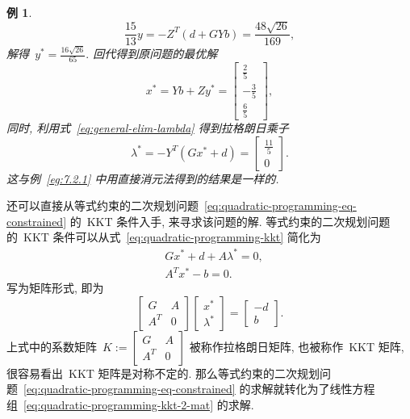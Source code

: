 \documentclass{SBCbookchapter}
\newtheorem{exam}[thm]{例}
\numberwithin{equation}{section}
\begin{document}
\begin{exam}
\begin{equation*}
\frac{15}{13} y = - Z^T \left( d + G Y b \right) = \frac{48 \sqrt{26}}{169},
\end{equation*}
解得~$y^* = \frac{16 \sqrt{26}}{65}.$ 回代得到原问题的最优解
\begin{equation*}
{x}^* = Y {b} + Z y^* = \left[\begin{matrix} \frac{2}{5} \\ - \frac{3}{5} \\ \frac{6}{5} \end{matrix}\right],
\end{equation*}
同时, 利用式~\eqref{eq:general-elim-lambda} 得到拉格朗日乘子
\begin{equation*}
{\lambda}^* = - Y^T \left( G {x}^* + {d} \right) = \left[\begin{matrix} \frac{11}{5} \\ 0 \end{matrix}\right].
\end{equation*}
这与例~\eqref{eg:7.2.1} 中用直接消元法得到的结果是一样的.
\end{exam}

还可以直接从等式约束的二次规划问题~\eqref{eq:quadratic-programming-eq-constrained} 的~KKT 条件入手,  来寻求该问题的解. 等式约束的二次规划问题的~KKT 条件可以从式~\eqref{eq:quadratic-programming-kkt} 简化为
\begin{equation}
\label{eq:quadratic-programming-kkt-2}
\begin{aligned}
& G {x}^* + {d} + A {\lambda}^* = {0}, \\
& A^T {x}^* - {b} = {0}.
\end{aligned}
\end{equation}
写为矩阵形式, 即为
\begin{equation}
\label{eq:quadratic-programming-kkt-2-mat}
\begin{bmatrix} G & A \\ A^T & 0 \end{bmatrix} \begin{bmatrix} {x}^* \\ {\lambda}^* \end{bmatrix} = \begin{bmatrix} -{d} \\ {b} \end{bmatrix}.
\end{equation}
上式中的系数矩阵~$K := \begin{bmatrix} G & A \\ A^T & 0 \end{bmatrix}$ 被称作拉格朗日矩阵,
也被称作~KKT 矩阵, 很容易看出~KKT 矩阵是对称不定的.
那么等式约束的二次规划问题~\eqref{eq:quadratic-programming-eq-constrained} 的求解就转化为了线性方程组~\eqref{eq:quadratic-programming-kkt-2-mat} 的求解.
\end{document}
